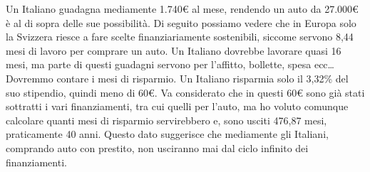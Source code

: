 \documentclass[12pt]{book} %
\begin{document}
Un Italiano guadagna mediamente 1.740€ al mese, rendendo un auto da 27.000€ è al di sopra delle sue possibilità.
Di seguito possiamo vedere che in Europa solo la Svizzera riesce a fare scelte finanziariamente sostenibili, siccome servono 8,44 mesi di lavoro per comprare un auto. Un Italiano dovrebbe lavorare quasi 16 mesi, ma parte di questi guadagni servono per l'affitto, bollette, spesa ecc… Dovremmo contare i mesi di risparmio. Un Italiano risparmia solo il 3,32\% del suo stipendio, quindi meno di 60€. Va considerato che in questi 60€ sono già stati sottratti i vari finanziamenti, tra cui quelli per l'auto, ma ho voluto comunque calcolare quanti mesi di risparmio servirebbero e, sono usciti 476,87 mesi, praticamente 40 anni. 
Questo dato suggerisce che mediamente gli Italiani, comprando auto con prestito, non usciranno mai dal ciclo infinito dei finanziamenti.
\end{document}
